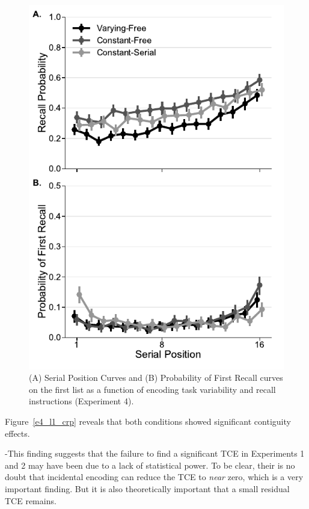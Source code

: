 \documentclass[man,natbib,floatsintext]{apa6} %
\begin{document}
\begin{figure}
\includegraphics{figures/E4_spc_list1.pdf}
\caption{(A) Serial Position Curves and (B) Probability of First Recall curves on the first list as a function of encoding task variability and recall instructions (Experiment 4). \spcpaneltext}
\label{e4_l1_spc}
\end{figure}

Figure~\ref{e4_l1_crp} reveals that both conditions showed significant contiguity effects.

-This finding suggests that the failure to find a significant TCE in Experiments 1 and 2 may have been due to a lack of statistical power. To be clear, their is no doubt that incidental encoding can reduce the TCE to \emph{near} zero, which is a very important finding. But it is also theoretically important that a small residual TCE remains.
\end{document}
